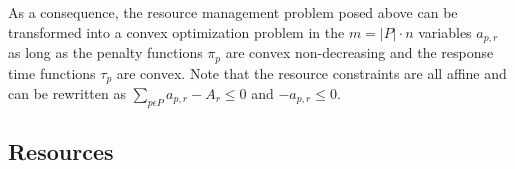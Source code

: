 As a consequence, the resource management problem posed above can be transformed into a convex optimization problem in the $m = |P|\cdot n$ variables $a_{p,r}$ as long as the penalty functions $\pi_p$ are convex non-decreasing and the response time functions $\tau_p$ are convex.
Note that the resource constraints are all affine and can be rewritten as
$\sum_{p\epsilon P} a_{p,r} - A_r \leq 0$ and $-a_{p,r} \leq 0$.

\subsection*{Resources}


